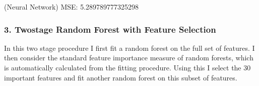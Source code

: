 \documentclass[letterpaper,10pt,english]{sphinxmanual}
\begin{document}
\begin{sphinxVerbatim}[commandchars=\\\{\}]
  
       
 

  
   
\end{sphinxVerbatim}

\begin{sphinxVerbatim}[commandchars=\\\{\}]
(Neural Network) MSE: 5.289789777325298
\end{sphinxVerbatim}


\subsubsection{3. Two\sphinxhyphen{}stage Random Forest with Feature Selection}
\label{\detokenize{simulated_final:two-stage-random-forest-with-feature-selection}}
In this two stage procedure I first fit a random forest on the full set of features. I then consider the standard feature importance measure of random forests, which is automatically calculated from the fitting procedure. Using this I select the 30  important features and fit another random forest on this subset of features.

\end{document}
